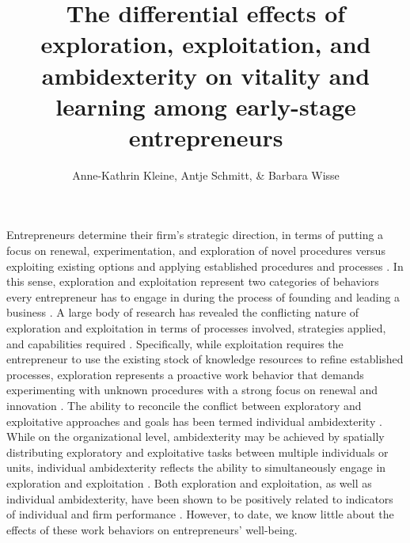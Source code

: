 \documentclass[man, 12pt, a4paper, noextraspace]{apa6}
\title{The differential effects of exploration, exploitation, and ambidexterity on vitality and learning among early-stage entrepreneurs}
\author{Anne-Kathrin Kleine, Antje Schmitt, \& Barbara Wisse}
\affiliation{University of Groningen}
\begin{document}
\maketitle

Entrepreneurs determine their firm's strategic direction, in terms of putting a focus on renewal, experimentation, and exploration of novel procedures versus exploiting existing options and applying established procedures and processes \parencite{Siren.2012, Ireland2009, Webb2010}.
In this sense, exploration and exploitation represent two categories of behaviors every entrepreneur has to engage in during the process of founding and leading a business \parencite[e.g.,][]{Rosing.2017, DuaneIreland2007, Siren.2012}. 
A large body of research has revealed the conflicting nature of exploration and exploitation in terms of processes involved, strategies applied, and capabilities required \parencite[e.g.,][]{He2004}.
Specifically, while exploitation requires the entrepreneur to use the existing stock of knowledge resources to refine established processes, exploration represents a proactive work behavior that demands experimenting with unknown procedures with a strong focus on renewal and innovation \parencite[e.g.,][]{Mom.2007}.
The ability to reconcile the conflict between exploratory and exploitative approaches and goals has been termed individual ambidexterity \parencite[e.g.,][]{Mom.2007}. 
While on the organizational level, ambidexterity may be achieved by spatially distributing exploratory and exploitative tasks between multiple individuals or units, individual ambidexterity reflects the ability to simultaneously engage in exploration and exploitation \parencite{He2004, Good.2013, Keller2015}. 
Both exploration and exploitation, as well as individual ambidexterity, have been shown to be positively related to indicators of individual and firm performance \parencite[e.g.,][]{Rosing.2017, Vicentini.2019, Mom.2018}.
However, to date, we know little about the effects of these work behaviors on entrepreneurs' well-being. \par 
\end{document}
